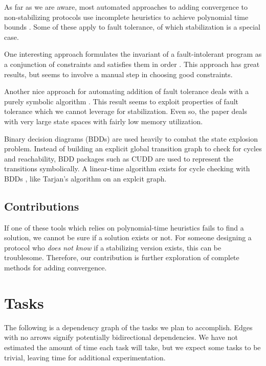 As far as we are aware, most automated approaches to adding convergence to non-stabilizing protocols use incomplete heuristics to achieve polynomial time bounds \cite{sycraft2008,ftsyn,taasFarahat12}.
Some of these apply to fault tolerance, of which stabilization is a special case.

One interesting approach formulates the invariant of a fault-intolerant program as a conjunction of constraints and satisfies them in order \cite{sssAbujaradK09}.
This approach has great results, but seems to involve a manual step in choosing good constraints.

Another nice approach for automating addition of fault tolerance deals with a purely symbolic algorithm \cite{icdcs07Borzoo}.
This result seems to exploit properties of fault tolerance which we cannot leverage for stabilization.
Even so, the paper deals with very large state spaces with fairly low memory utilization.

Binary decision diagrams (BDDs) are used heavily to combat the state explosion problem.
Instead of building an explicit global transition graph to check for cycles and reachability, BDD packages such as CUDD \cite{somenzi1998cudd} are used to represent the transitions symbolically.
A linear-time algorithm exists for cycle checking with BDDs \cite{sodaGentilini03}, like Tarjan's algorithm on an explcit graph.

\subsection{Contributions}

If one of these tools which relies on polynomial-time heuristics fails to find a solution, we cannot be sure if a solution exists or not.
For someone designing a protocol who {\em does not know} if a stabilizing version exists, this can be troublesome.
Therefore, our contribution is further exploration of complete methods for adding convergence.

\section{Tasks}

The following is a dependency graph of the tasks we plan to accomplish.
Edges with no arrows signify potentially bidirectional dependencies.
We have not estimated the amount of time each task will take, but we expect some tasks to be trivial, leaving time for additional experimentation.

